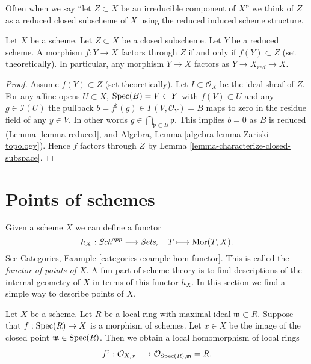 \noindent
Often when we say ``let $Z \subset X$ be an irreducible component of $X$''
we think of $Z$ as a reduced closed subscheme of $X$ using the reduced induced
scheme structure.

\begin{lemma}
\label{lemma-map-into-reduction}
Let $X$ be a scheme.
Let $Z \subset X$ be a closed subscheme.
Let $Y$ be a reduced scheme.
A morphism $f : Y \to X$ factors through $Z$ if and only if
$f(Y) \subset Z$ (set theoretically). In particular, any
morphism $Y \to X$ factors as $Y \to X_{red} \to X$.
\end{lemma}

\begin{proof}
Assume $f(Y) \subset Z$ (set theoretically).
Let $I \subset \mathcal{O}_X$ be the ideal sheaf of $Z$.
For any affine opens $U \subset X$, $\mathop{\rm Spec}(B) = V \subset Y$
with $f(V) \subset U$ and any $g \in \mathcal{I}(U)$
the pullback $b = f^\sharp(g) \in \Gamma(V, \mathcal{O}_Y) = B$
maps to zero in the residue field of any $y \in V$.
In other words $g \in \bigcap_{\mathfrak p \subset B} \mathfrak p$.
This implies $b = 0$ as $B$ is reduced (Lemma \ref{lemma-reduced}, and
Algebra, Lemma \ref{algebra-lemma-Zariski-topology}).
Hence $f$ factors through
$Z$ by Lemma \ref{lemma-characterize-closed-subspace}.
\end{proof}










\section{Points of schemes}
\label{section-points}

\noindent
Given a scheme $X$ we can define a functor
$$
h_X : \textit{Sch}^{opp}
\longrightarrow
\textit{Sets}, \quad
T \longmapsto \mathop{\rm Mor}\nolimits(T, X).
$$
See Categories, Example \ref{categories-example-hom-functor}.
This is called the {\it functor of points of $X$}.
A fun part of scheme theory is to find descriptions of
the internal geometry of $X$ in terms of this functor $h_X$.
In this section we find a simple way to describe
points of $X$.

\medskip\noindent
Let $X$ be a scheme. Let $R$ be a local ring with maximal ideal
$\mathfrak m \subset R$. Suppose that $f : \mathop{\rm Spec}(R) \to X$
is a morphism of schemes. Let $x \in X$ be the image of the closed point
$\mathfrak m \in \mathop{\rm Spec}(R)$. Then we obtain a local homomorphism
of local rings
$$
f^\sharp :
\mathcal{O}_{X, x}
\longrightarrow
\mathcal{O}_{\mathop{\rm Spec}(R), \mathfrak m} = R.
$$

